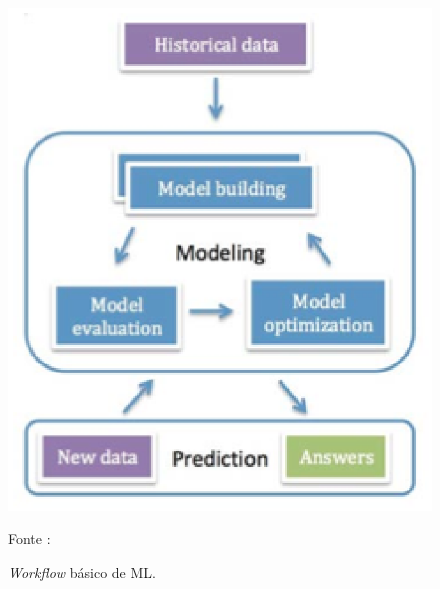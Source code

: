     \begin{figure}[ht]
            \centering
            \label{fig06}
                \includegraphics[keepaspectratio=true, scale=0.7]{editaveis/images/mlworkflow.eps}
            \caption{\textit{Workflow} básico de ML.}
            Fonte : \cite{brink2015}
    \end{figure}

